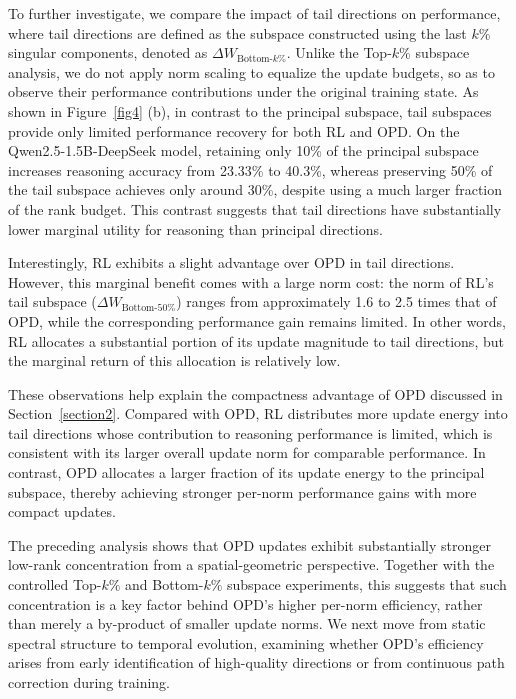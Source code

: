 \documentclass{llmxive}
\begin{document}
To further investigate, we compare the impact of tail directions on performance, where tail directions are defined as the subspace constructed using the last $k\%$ singular components, denoted as $\Delta W_{\text{Bottom-}k\%}$. Unlike the Top-$k\%$ subspace analysis, we do not apply norm scaling to equalize the update budgets, so as to observe their performance contributions under the original training state. As shown in Figure~\ref{fig4} (b), in contrast to the principal subspace, tail subspaces provide only limited performance recovery for both RL and OPD. On the Qwen2.5-1.5B-DeepSeek model, retaining only 10\% of the principal subspace increases reasoning accuracy from 23.33\% to 40.3\%, whereas preserving 50\% of the tail subspace achieves only around 30\%, despite using a much larger fraction of the rank budget. This contrast suggests that tail directions have substantially lower marginal utility for reasoning than principal directions.

Interestingly, RL exhibits a slight advantage over OPD in tail directions. However, this marginal benefit comes with a large norm cost: the norm of RL's tail subspace ($\Delta W_{\text{Bottom-}50\%}$) ranges from approximately 1.6 to 2.5 times that of OPD, while the corresponding performance gain remains limited. In other words, RL allocates a substantial portion of its update magnitude to tail directions, but the marginal return of this allocation is relatively low.

These observations help explain the compactness advantage of OPD discussed in Section~\ref{section2}. Compared with OPD, RL distributes more update energy into tail directions whose contribution to reasoning performance is limited, which is consistent with its larger overall update norm for comparable performance. In contrast, OPD allocates a larger fraction of its update energy to the principal subspace, thereby achieving stronger per-norm performance gains with more compact updates.

The preceding analysis shows that OPD updates exhibit substantially stronger low-rank concentration from a spatial-geometric perspective. Together with the controlled Top-$k\%$ and Bottom-$k\%$ subspace experiments, this suggests that such concentration is a key factor behind OPD's higher per-norm efficiency, rather than merely a by-product of smaller update norms. We next move from static spectral structure to temporal evolution, examining whether OPD's efficiency arises from early identification of high-quality directions or from continuous path correction during training.
\end{document}
